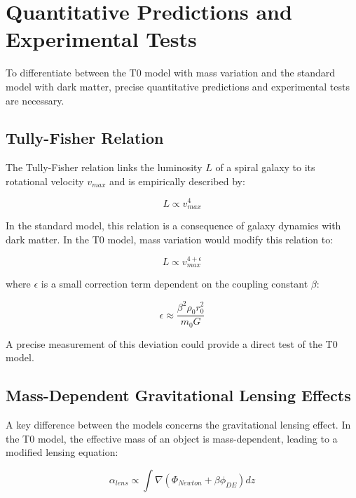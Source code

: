\documentclass[a4paper,12pt]{article}
\begin{document}
\section{Quantitative Predictions and Experimental Tests}

To differentiate between the T0 model with mass variation and the standard model with dark matter, precise quantitative predictions and experimental tests are necessary.

\subsection{Tully-Fisher Relation}

The Tully-Fisher relation links the luminosity $L$ of a spiral galaxy to its rotational velocity $v_{max}$ and is empirically described by:

\begin{equation}
	L \propto v_{max}^{4}
\end{equation}

In the standard model, this relation is a consequence of galaxy dynamics with dark matter. In the T0 model, mass variation would modify this relation to:

\begin{equation}
	L \propto v_{max}^{4+\epsilon}
\end{equation}

where $\epsilon$ is a small correction term dependent on the coupling constant $\beta$:

\begin{equation}
	\epsilon \approx \frac{\beta^2 \rho_0 r_0^2}{m_0 G}
\end{equation}

A precise measurement of this deviation could provide a direct test of the T0 model.

\subsection{Mass-Dependent Gravitational Lensing Effects}

A key difference between the models concerns the gravitational lensing effect. In the T0 model, the effective mass of an object is mass-dependent, leading to a modified lensing equation:

\begin{equation}
	\alpha_{lens} \propto \int \nabla(\Phi_{Newton} + \beta\phi_{DE}) dz
\end{equation}
\end{document}

